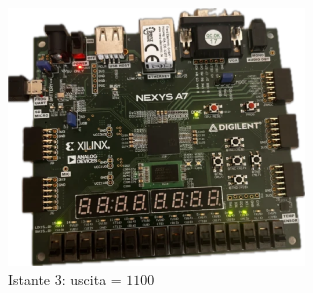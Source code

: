 \begin{figure}[H]
	\centering
	\includegraphics[width=0.7\textwidth]{img/Test3_ROM_M_MEMwebp.png}
	\caption{Istante 3: uscita = $1100$}
	\label{schemROM_M_MEM} 
\end{figure}

